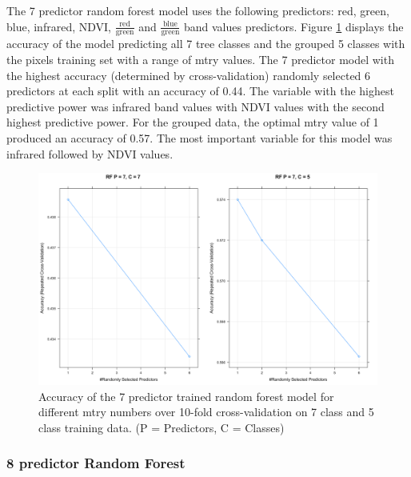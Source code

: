 \documentclass[12pt,twoside]{reedthesis}
\begin{document}
The 7 predictor random forest model uses the following predictors: red, green, blue, infrared, NDVI, \(\frac{\mbox{red}}{\mbox{green}}\) and \(\frac{\mbox{blue}}{\mbox{green}}\) band values predictors. Figure \ref{fig:rf7} displays the accuracy of the model predicting all 7 tree classes and the grouped 5 classes with the pixels training set with a range of mtry values. The 7 predictor model with the highest accuracy (determined by cross-validation) randomly selected 6 predictors at each split with an accuracy of 0.44. The variable with the highest predictive power was infrared band values with NDVI values with the second highest predictive power. For the grouped data, the optimal mtry value of 1 produced an accuracy of 0.57. The most important variable for this model was infrared followed by NDVI values.
\begin{figure}

{\centering \includegraphics[width=0.9\linewidth]{figure/rf7_mtry} 

}

\caption{Accuracy of the 7 predictor trained random forest model for different mtry numbers over 10-fold cross-validation on 7 class and 5 class training data. (P = Predictors, C = Classes)}\label{fig:rf7}
\end{figure}
\hypertarget{predictor-random-forest-1}{%
\subsubsection{8 predictor Random Forest}\label{predictor-random-forest-1}}
\end{document}
